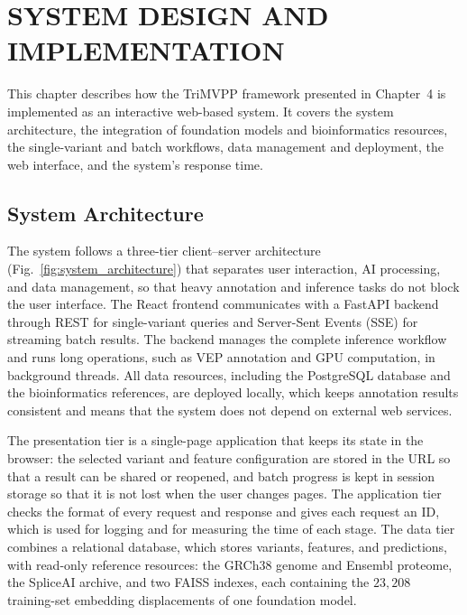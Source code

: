 
\chapter{SYSTEM DESIGN AND IMPLEMENTATION}
\label{chap:system_design}

This chapter describes how the TriMVPP framework presented in Chapter~4 is implemented as an interactive web-based system. It covers the system architecture, the integration of foundation models and bioinformatics resources, the single-variant and batch workflows, data management and deployment, the web interface, and the system's response time.

\section{System Architecture}
\label{sec:system_architecture}

The system follows a three-tier client--server architecture (Fig.~\ref{fig:system_architecture}) that separates user interaction, AI processing, and data management, so that heavy annotation and inference tasks do not block the user interface. The React frontend communicates with a FastAPI backend through REST for single-variant queries and Server-Sent Events (SSE) for streaming batch results. The backend manages the complete inference workflow and runs long operations, such as VEP annotation and GPU computation, in background threads. All data resources, including the PostgreSQL database and the bioinformatics references, are deployed locally, which keeps annotation results consistent and means that the system does not depend on external web services.

The presentation tier is a single-page application that keeps its state in the browser: the selected variant and feature configuration are stored in the URL so that a result can be shared or reopened, and batch progress is kept in session storage so that it is not lost when the user changes pages. The application tier checks the format of every request and response and gives each request an ID, which is used for logging and for measuring the time of each stage. The data tier combines a relational database, which stores variants, features, and predictions, with read-only reference resources: the GRCh38 genome and Ensembl proteome, the SpliceAI archive, and two FAISS indexes, each containing the $23{,}208$ training-set embedding displacements of one foundation model.

